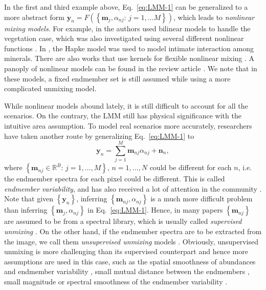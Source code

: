 \documentclass[twocolumn,english]{IEEEtran}
\theoremstyle{plain}
\begin{document}
In the first and third example above, Eq.~\eqref{eq:LMM-1} can be
generalized to a more abstract form $\mathbf{y}_{n}=F\left(\left\{ \mathbf{m}_{j},\alpha_{nj}:\,j=1,\dots M\right\} \right)$,
which leads to \emph{nonlinear mixing models}. For example, in \cite{halimi2011nonlinear}
the authors used bilinear models to handle the vegetation case, which
was also investigated using several different nonlinear functions
\cite{somers2009nonlinear}. In \cite{heylen2014nonlinear}, the Hapke
model was used to model intimate interaction among minerals. There
are also works that use kernels for flexible nonlinear mixing \cite{broadwater2010generalized,broadwater2007kernel}.
A panoply of nonlinear models can be found in the review article \cite{HeylenParenteGader2014}.
We note that in these models, a fixed endmember set is still assumed
while using a more complicated unmixing model.

\IEEEpubidadjcol

While nonlinear models abound lately, it is still difficult to account
for all the scenarios. On the contrary, the LMM still has physical
significance with the intuitive area assumption. To model real scenarios
more accurately, researchers have taken another route by generalizing
Eq.~\eqref{eq:LMM-1} to 
\begin{equation}
\mathbf{y}_{n}=\sum_{j=1}^{M}\mathbf{m}_{nj}\alpha_{nj}+\mathbf{n}_{n},\label{eq:LMM_n}
\end{equation}
where $\left\{ \mathbf{m}_{nj}\in\mathbb{R}^{B}:\,j=1,\dots,M\right\} ,\,n=1,\dots,N$
could be different for each $n$, i.e. the endmember spectra for each
pixel could be different. This is called \emph{endmember variability},
and has also received a lot of attention in the community \cite{somers2011endmember,zare2014endmember}.
Note that given $\left\{ \mathbf{y}_{n}\right\} $, inferring $\left\{ \mathbf{m}_{nj},\alpha_{nj}\right\} $
is a much more difficult problem than inferring $\left\{ \mathbf{m}_{j},\alpha_{nj}\right\} $
in Eq.~\eqref{eq:LMM-1}. Hence, in many papers $\left\{ \mathbf{m}_{nj}\right\} $
are assumed to be from a spectral library, which is usually called
\emph{supervised unmixing} \cite{du2014spatial,zare2010pce,roberts1998mapping}.
On the other hand, if the endmember spectra are to be extracted from
the image, we call them \emph{unsupervised unmixing} models \cite{halimi2015unsupervised,eches2010bayesian,bateson2000endmember}.
Obviously, unsupervised unmixing is more challenging than its supervised
counterpart and hence more assumptions are used in this case, such
as the spatial smoothness of abundances and endmember variability
\cite{drumetz2016blind,thouvenin2016hyperspectral,halimi2016hyperspectral},
small mutual distance between the endmembers \cite{thouvenin2016hyperspectral},
small magnitude or spectral smoothness of the endmember variability
\cite{thouvenin2016hyperspectral,halimi2016hyperspectral}.
\end{document}
